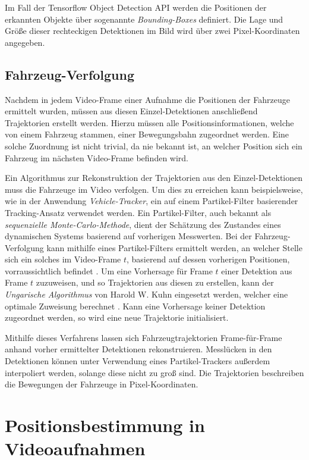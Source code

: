 Im Fall der Tensorflow Object Detection API werden die Positionen der erkannten Objekte über sogenannte
\textit{Bounding-Boxes} definiert. Die Lage und Größe dieser rechteckigen Detektionen im Bild wird über
zwei Pixel-Koordinaten angegeben. \cite[]{Huang2018}

\subsection{Fahrzeug-Verfolgung}

Nachdem in jedem Video-Frame einer Aufnahme die Positionen der Fahrzeuge ermittelt wurden,
müssen aus diesen Einzel-Detektionen anschließend Trajektorien erstellt werden.
Hierzu müssen alle Positionsinformationen, welche von einem Fahrzeug stammen, einer Bewegungsbahn zugeordnet werden.
Eine solche Zuordnung ist nicht trivial, da nie bekannt ist, an welcher Position sich ein Fahrzeug im
nächsten Video-Frame befinden wird.

Ein Algorithmus zur Rekonstruktion der Trajektorien aus den Einzel-Detektionen muss die Fahrzeuge im Video
verfolgen. Um dies zu erreichen kann beispielsweise, wie in der Anwendung \textit{Vehicle-Tracker},
ein auf einem Partikel-Filter basierender Tracking-Ansatz verwendet werden.
Ein Partikel-Filter, auch bekannt als \textit{sequenzielle Monte-Carlo-Methode}, dient der Schätzung
des Zustandes eines dynamischen Systems basierend auf vorherigen Messwerten.
Bei der Fahrzeug-Verfolgung kann mithilfe eines Partikel-Filters ermittelt werden, an welcher Stelle sich
ein solches im Video-Frame $t$, basierend auf dessen vorherigen Positionen, vorraussichtlich befindet \cite[]{Apeltauer2015}.
Um eine Vorhersage für Frame $t$ einer Detektion aus Frame $t$ zuzuweisen, und so Trajektorien aus diesen zu erstellen,
kann der \textit{Ungarische Algorithmus} von Harold W. Kuhn eingesetzt werden, welcher eine optimale
Zuweisung berechnet \cite[]{Szottka2011}. Kann eine Vorhersage keiner Detektion zugeordnet werden,
so wird eine neue Trajektorie initialisiert.

Mithilfe dieses Verfahrens lassen sich Fahrzeugtrajektorien Frame-für-Frame anhand vorher ermittelter
Detektionen rekonstruieren. Messlücken in den Detektionen können unter Verwendung eines Partikel-Trackers
außerdem interpoliert werden, solange diese nicht zu groß sind. 
Die Trajektorien beschreiben die Bewegungen der Fahrzeuge in Pixel-Koordinaten.

\section{Positionsbestimmung in Videoaufnahmen}
\label{sec:grund_mapMatching}

